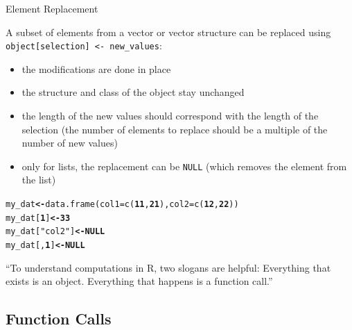 \documentclass{beamer}\usepackage[]{graphicx}\usepackage[]{color}
\makeatletter
\newcommand{\hlnum}[1]{\textcolor[rgb]{0.502,0,0.502}{\textbf{#1}}}%
\newcommand{\hlstr}[1]{\textcolor[rgb]{0.651,0.522,0}{#1}}%
\newcommand{\hlstd}[1]{\textcolor[rgb]{0,0,0}{#1}}%
\newcommand{\hlkwa}[1]{\textcolor[rgb]{0.733,0.475,0.467}{\textbf{#1}}}%
\newcommand{\hlkwb}[1]{\textcolor[rgb]{0.502,0.502,0.753}{\textbf{#1}}}%
\newcommand{\hlkwc}[1]{\textcolor[rgb]{0,0.502,0.753}{#1}}%
\newcommand{\hlkwd}[1]{\textcolor[rgb]{0,0.267,0.4}{#1}}%
\newenvironment{kframe}{%
 \def\at@end@of@kframe{}%
 \ifinner\ifhmode%
  \def\at@end@of@kframe{\end{minipage}}%
  \begin{minipage}{\columnwidth}%
 \fi\fi%
 \def\FrameCommand##1{\hskip\@totalleftmargin \hskip-\fboxsep
 \colorbox{shadecolor}{##1}\hskip-\fboxsep
     \hskip-\linewidth \hskip-\@totalleftmargin \hskip\columnwidth}%
 \MakeFramed {\advance\hsize-\width
   \@totalleftmargin\z@ \linewidth\hsize
   \@setminipage}}%
 {\par\unskip\endMakeFramed%
 \at@end@of@kframe}
\newenvironment{knitrout}{}{} %
\makeatother
\begin{document}
\begin{frame}[fragile]{Element Replacement}

A subset of elements from a vector or vector structure can be replaced using \texttt{object[selection] <- new\_values}:

\begin{itemize}
  \item the modifications are done in place
  \item the structure and class of the object stay unchanged
  \item the length of the new values should correspond with the length of the selection (the number of elements to replace should be a multiple of the number of new values)
  \item only for lists, the replacement can be \texttt{NULL} (which removes the element from the list)
\end{itemize}

\begin{knitrout}
\color{fgcolor}\begin{kframe}
\begin{alltt}
\hlstd{my_dat} \hlkwb{<-} \hlkwd{data.frame}\hlstd{(}\hlkwc{col1} \hlstd{=} \hlkwd{c}\hlstd{(}\hlnum{11}\hlstd{,} \hlnum{21}\hlstd{),} \hlkwc{col2} \hlstd{=} \hlkwd{c}\hlstd{(}\hlnum{12}\hlstd{,} \hlnum{22}\hlstd{))}
\hlstd{my_dat[}\hlnum{1}\hlstd{]} \hlkwb{<-} \hlnum{33}
\hlstd{my_dat[}\hlstr{"col2"}\hlstd{]} \hlkwb{<-} \hlkwa{NULL}
\hlstd{my_dat[,}\hlnum{1}\hlstd{]} \hlkwb{<-} \hlkwa{NULL}
\end{alltt}
\end{kframe}
\end{knitrout}
\end{frame}


\begin{frame}[fragile]
\begin{exampleblock}{}
  {\large ``To understand computations in R, two slogans are helpful: Everything that exists is an object. Everything that happens is a function call.''}
  \vskip5mm
  \hspace*{}
\end{exampleblock}
\end{frame}


\subsection{Function Calls}
\end{document}

